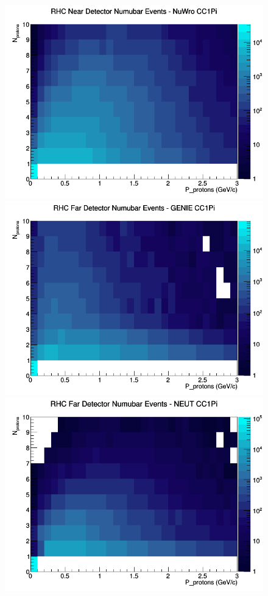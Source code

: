 \begin{figure}[h]
\includegraphics[width=\linewidth]{N_P/nominal/protons/CC1Pi_RHC_ND_numubar_N_P_NuWro.png}
\endminipage
\newline
{}
\includegraphics[width=\linewidth]{N_P/nominal/protons/CC1Pi_RHC_FD_numubar_N_P_GENIE.png}
\endminipage
{}
\includegraphics[width=\linewidth]{N_P/nominal/protons/CC1Pi_RHC_FD_numubar_N_P_NEUT.png}

\end{figure}
